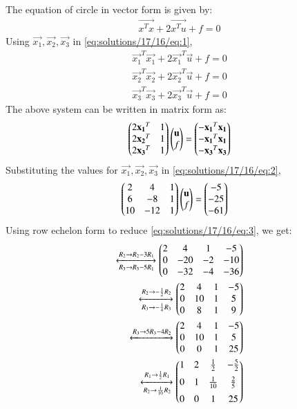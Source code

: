 The equation of circle in vector form is given by:
\begin{align}
\vec{x^Tx}+2\vec{x^Tu}+f = 0 \label{eq:solutions/17/16/eq:1}
\end{align}
Using $\vec{x_1}, \vec{x_2}, \vec{x_3}$ in \eqref{eq:solutions/17/16/eq:1},
\begin{align}
\vec{x_1}^T\vec{x_1}+2\vec{x_1}^T\vec{u}+f=0\\
\vec{x_2}^T\vec{x_2}+2\vec{x_2}^T\vec{u}+f=0\\
\vec{x_3}^T\vec{x_3}+2\vec{x_3}^T\vec{u}+f=0
\end{align}
The above system can be written in matrix form as:
\begin{align}
\begin{pmatrix}2\mathbf{x_1}^T & 1\\2\mathbf{x_2}^T & 1\\2\mathbf{x_3}^T & 1\end{pmatrix}\begin{pmatrix}\mathbf{u}\\f\end{pmatrix}=\begin{pmatrix}-\mathbf{x_1}^T\mathbf{x_1}\\-\mathbf{x_1}^T\mathbf{x_1}\\-\mathbf{x_3}^T\mathbf{x_3}\end{pmatrix} \label{eq:solutions/17/16/eq:2}
\end{align}
Substituting the values for $\vec{x_1}, \vec{x_2}, \vec{x_3}$ in \eqref{eq:solutions/17/16/eq:2},
\begin{align}
\begin{pmatrix}2 & 4 & 1\\6 & -8 & 1\\10 & -12 & 1\end{pmatrix}\begin{pmatrix}\mathbf{u}\\f\end{pmatrix}&=\begin{pmatrix}-5\\-25\\-61\end{pmatrix} \label{eq:solutions/17/16/eq:3}
\end{align}
Using row echelon form to reduce \eqref{eq:solutions/17/16/eq:3}, we get:
\begin{align}
\xleftrightarrow[R_3\rightarrow R_3-5R_1]{R_2\rightarrow R_2-3R_1}\begin{pmatrix}2 & 4 & 1 & -5\\0 & -20 & -2 & -10\\ 0 & -32 & -4 & -36\end{pmatrix}\\
\xleftrightarrow[R_3\rightarrow -\frac{1}{4}R_3]{R_2 \rightarrow -\frac{1}{2}R_2}\begin{pmatrix}2 & 4 & 1 & -5\\0 & 10 & 1 & 5\\ 0 & 8 & 1 & 9\end{pmatrix}\\
\xleftrightarrow[]{R_3 \rightarrow 5R_3-4R_2}\begin{pmatrix}2 & 4 & 1 & -5\\0 & 10 & 1 & 5\\ 0 & 0 & 1 & 25\end{pmatrix}\\ \label{eq:solutions/17/16/eq:4}
\xleftrightarrow[R_2 \rightarrow \frac{1}{10}R_2]{R_1 \rightarrow \frac{1}{2}R_1}\begin{pmatrix}1 & 2 & \frac{1}{2} & -\frac{5}{2}\\[0.2cm]0 & 1 & \frac{1}{10} & \frac{2}{5}\\[0.2cm] 0 & 0 & 1 & 25\end{pmatrix}
\end{align}
